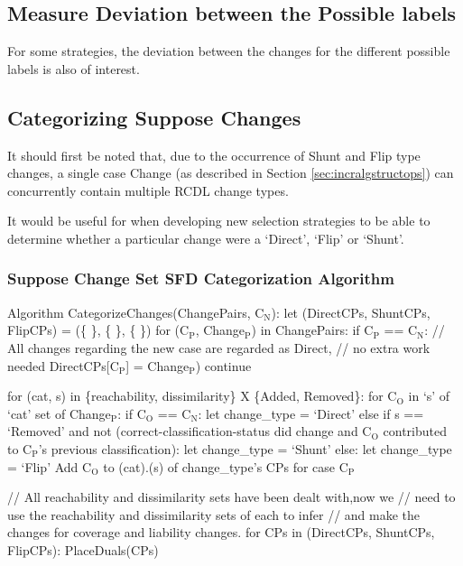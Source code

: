 \documentclass[a4paper,11pt]{report}
\newcommand{\sbt}[1]{\ensuremath{_{\textrm{#1}}}}
\begin{document}
\subsection{Measure Deviation between the Possible labels}
For some strategies, the deviation between the changes for the different possible labels is also of interest.

\subsection{Categorizing Suppose Changes}
It should first be noted that, due to the occurrence of Shunt and Flip type changes, a single case Change (as described in Section \ref{sec:incralgstructops}) can concurrently contain multiple RCDL change types.

It would be useful for when developing new selection strategies to be able to determine whether a particular change were a `Direct', `Flip' or `Shunt'.

\newpage
\subsubsection{Suppose Change Set SFD Categorization Algorithm}
\begin{code}
Algorithm CategorizeChanges(ChangePairs, C\sbt{N}):
  let (DirectCPs, ShuntCPs, FlipCPs) = (\{ \}, \{ \}, \{ \})
  for (C\sbt{P}, Change\sbt{P}) in ChangePairs:
    if C\sbt{P} == C\sbt{N}:
      // All changes regarding the new case are regarded as Direct, 
      // no extra work needed
      DirectCPs[C\sbt{P}] = Change\sbt{P})
      continue
    
    for (cat, s) in \{reachability, dissimilarity\} X \{Added, Removed\}:
      for C\sbt{O} in `s' of `cat' set of Change\sbt{P}:
        if C\sbt{O} == C\sbt{N}:
          let change_type = `Direct'
        else if s == `Removed' 
            and not (correct-classification-status did change
                     and C\sbt{O} contributed to C\sbt{P}'s previous classification):
          let change_type = `Shunt'
        else:
          let change_type = `Flip'
      Add C\sbt{O} to (cat).(s) of change_type's CPs for case C\sbt{P}
    
  // All reachability and dissimilarity sets have been dealt with,now we
  // need to use the reachability and dissimilarity sets of each to infer
  // and make the changes for coverage and liability changes.
  for CPs in (DirectCPs, ShuntCPs, FlipCPs):
    PlaceDuals(CPs)
\end{code}
\end{document}
